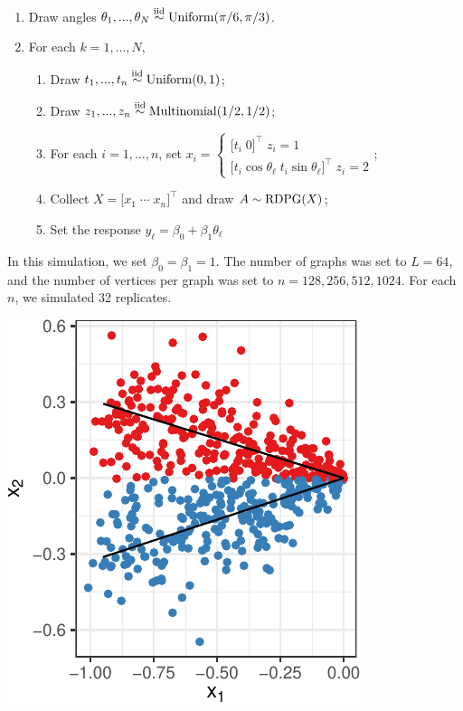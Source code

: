 \documentclass[12pt]{article}
\providecommand{\tightlist}{%
  \setlength{\itemsep}{0pt}\setlength{\parskip}{0pt}}
\begin{document}
\begin{enumerate}
\def\labelenumi{\arabic{enumi}.}
\tightlist
\item
  Draw angles
  \(\theta_1, ..., \theta_N \stackrel{\mathrm{iid}}{\sim} \mathrm{Uniform}(\pi / 6, \pi / 3)\).
\item
  For each \(k = 1, ..., N\),

  \begin{enumerate}
  \def\labelenumii{\roman{enumii}.}
  \tightlist
  \item
    Draw \(t_1, ..., t_n \stackrel{\mathrm{iid}}{\sim} \mathrm{Uniform}(0, 1)\);
  \item
    Draw \(z_1, ..., z_n \stackrel{\mathrm{iid}}{\sim} \mathrm{Multinomial}(1/2, 1/2)\);
  \item
    For each \(i = 1, ..., n\), set
    \(x_i = \begin{cases} \bigl[ t_i \; 0 \bigr]^\top \; z_i = 1 \\ \bigl[ t_i \cos \theta_\ell \; t_i \sin \theta_\ell \bigr]^\top \; z_i = 2 \end{cases}\);
  \item
    Collect \(X = \bigl[ x_1 \; \cdots \; x_n \bigr]^\top\) and draw
    \(A \sim \mathrm{RDPG}(X)\);
  \item
    Set the response \(y_\ell = \beta_0 + \beta_1 \theta_\ell\)
  \end{enumerate}
\end{enumerate}

In this simulation, we set \(\beta_0 = \beta_1 = 1\). The number of
graphs was set to \(L = 64\), and the number of vertices per graph was
set to \(n = 128, 256, 512, 1024\). For each \(n\), we simulated 32
replicates.

\begin{center}\includegraphics{draft_files/figure-latex/angle-reg-example-1} \end{center}
\end{document}
